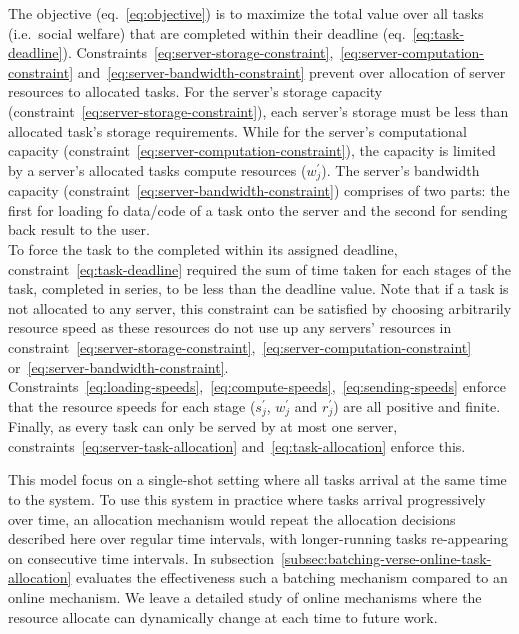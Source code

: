 The objective (eq.~\ref{eq:objective}) is to maximize the total value over all tasks (i.e.\ social welfare) that
are completed within their deadline (eq.~\ref{eq:task-deadline}).
Constraints~\ref{eq:server-storage-constraint},~\ref{eq:server-computation-constraint}
and~\ref{eq:server-bandwidth-constraint} prevent over allocation of server resources to allocated tasks.
For the server's storage capacity (constraint~\ref{eq:server-storage-constraint}), each server's storage must be less
than allocated task's storage requirements. While for the server's computational capacity
(constraint~\ref{eq:server-computation-constraint}), the capacity is limited by a server's allocated tasks
compute resources ($w^{'}_j$). The server's bandwidth capacity (constraint~\ref{eq:server-bandwidth-constraint})
comprises of two parts: the first for loading fo data/code of a task onto the server and the second for sending
back result to the user. \\
To force the task to the completed within its assigned deadline, constraint~\ref{eq:task-deadline} required the sum
of time taken for each stages of the task, completed in series, to be less than the deadline value.
Note that if a task is not allocated to any server, this constraint can be satisfied by choosing arbitrarily
resource speed as these resources do not use up any servers' resources in
constraint~\ref{eq:server-storage-constraint},~\ref{eq:server-computation-constraint}
or~\ref{eq:server-bandwidth-constraint}. \\
Constraints~\ref{eq:loading-speeds},~\ref{eq:compute-speeds},~\ref{eq:sending-speeds} enforce that the resource
speeds for each stage ($s^{'}_j$, $w^{'}_j$ and $r^{'}_j$) are all positive and finite.
Finally, as every task can only be served by at most one server, constraints~\ref{eq:server-task-allocation}
and~\ref{eq:task-allocation} enforce this.

This model focus on a single-shot setting where all tasks arrival at the same time to the system. To use this system
in practice where tasks arrival progressively over time, an allocation mechanism would repeat the allocation decisions
described here over regular time intervals, with longer-running tasks re-appearing on consecutive time intervals.
In subsection~\ref{subsec:batching-verse-online-task-allocation} evaluates the effectiveness such a batching mechanism
compared to an online mechanism. We leave a detailed study of online mechanisms where the resource allocate can
dynamically change at each time to future work.

